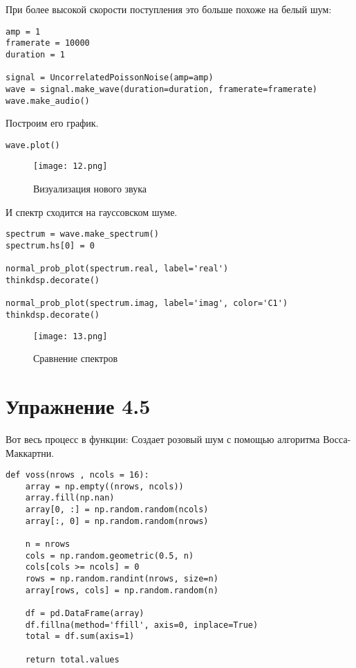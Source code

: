 \documentclass[a4paper,12pt]{report}
\begin{document}
При более высокой скорости поступления это больше похоже на белый шум:

\begin{lstlisting}[caption=Создание нового звука]
amp = 1
framerate = 10000
duration = 1

signal = UncorrelatedPoissonNoise(amp=amp)
wave = signal.make_wave(duration=duration, framerate=framerate)
wave.make_audio()
\end{lstlisting}

Построим его график.

\begin{lstlisting}[caption=Визуализация нового звука]
wave.plot()
\end{lstlisting}

\begin{figure}[H]
        \centering
        \texttt{[image: 12.png]}
        \caption{Визуализация нового звука}
        \label{fig:lab4_fig4_3}
\end{figure}

И спектр сходится на гауссовском шуме.

\begin{lstlisting}[caption=Сравнение спектров]
spectrum = wave.make_spectrum()
spectrum.hs[0] = 0

normal_prob_plot(spectrum.real, label='real')
thinkdsp.decorate()

normal_prob_plot(spectrum.imag, label='imag', color='C1')
thinkdsp.decorate()
\end{lstlisting}

\begin{figure}[H]
        \centering
        \texttt{[image: 13.png]}
        \caption{Сравнение спектров}
        \label{fig:lab4_fig4_4}
\end{figure}

\chapter{Упражнение 4.5}

Вот весь процесс в функции: Создает розовый шум с помощью алгоритма Восса-Маккартни.

\begin{lstlisting}[caption=Создание функции]
def voss(nrows , ncols = 16):
    array = np.empty((nrows, ncols))
    array.fill(np.nan)
    array[0, :] = np.random.random(ncols)
    array[:, 0] = np.random.random(nrows)
    
    n = nrows
    cols = np.random.geometric(0.5, n)
    cols[cols >= ncols] = 0
    rows = np.random.randint(nrows, size=n)
    array[rows, cols] = np.random.random(n)

    df = pd.DataFrame(array)
    df.fillna(method='ffill', axis=0, inplace=True)
    total = df.sum(axis=1)

    return total.values
\end{lstlisting}
\end{document}
